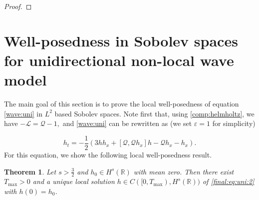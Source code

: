 \documentclass[final,11pt,a4paper,reqno]{amsart}
\newcommand{\RR}{\mathbb R}
\newtheorem{theorem}{Theorem}
\theoremstyle{definition}
\begin{document}
\begin{proof}
%
\end{proof}



\section{Well-posedness in Sobolev spaces for unidirectional non-local wave model}\label{sec:uni:wp}
The main goal of this section is to prove the local well-posedness of equation \eqref{wave:uni} in $L^2$ based Sobolev spaces. Note first that, using \eqref{comp:helmholtz}, we have
$ -\mathscr{L}=\mathscr{Q}-1,$
and \eqref{wave:uni} can be rewritten as (we set $\varepsilon=1$ for simplicity)


\begin{equation}\label{final:eq:uni:2}
h_{t}=-\frac{1}{2}\left(3 hh_{x}+[\mathscr{Q},\mathscr{Q}h_{x}]h - \mathscr{Q}h_{x}-h_{x} \right). 
\end{equation}
For this equation, we show the following local well-posedness result.
\begin{theorem}\label{theorem1}
Let $s>\frac{3}{2}$  and $h_0\in H^{s}(\RR)$ {with mean zero}. Then there exist $T_{\max}>0$ and a unique local solution $h\in C([0,T_{\max}),H^{s}(\RR))$ of \eqref{final:eq:uni:2} with $h(0)=h_{0}$.
\end{theorem}
\end{document}
